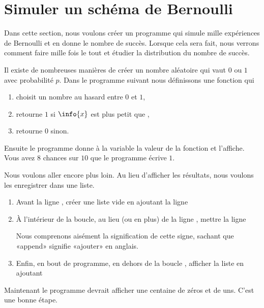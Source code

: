 \section{Simuler un schéma de Bernoulli}
\label{SecSimulBernrfNskC}

Dans cette section, nous voulons créer un programme qui simule mille expériences de Bernoulli et en donne le nombre de succès. Lorsque cela sera fait, nous verrons comment faire mille fois le tout et étudier la distribution du nombre de succès.

Il existe de nombreuses manières de créer un nombre aléatoire qui vaut \( 0\) ou \( 1\) avec probabilité \( p\). Dans le programme suivant nous définissons une fonction qui
\begin{enumerate}
\item
choisit un nombre  au hasard entre \( 0\) et \( 1\),
\item
retourne \( 1\) si \( \info{x}\) est plus petit que ,
\item
    retourne \( 0\) sinon.
\end{enumerate}
Ensuite le programme donne à la variable  la valeur de la fonction et l'affiche. Vous avez \( 8\) chances sur \( 10\) que le programme écrive \( 1\).




Nous voulons aller encore plus loin. Au lieu d'afficher les résultats, nous voulons les enregistrer dans une liste.
\begin{enumerate}
    \item
        Avant la ligne , créer une liste vide en ajoutant la ligne
        \begin{quote}
        \end{quote}
    \item
        À l'intérieur de la boucle, au lieu (ou en plus) de la ligne , mettre la ligne
        \begin{quote}
        \end{quote}
        Nous comprenons aisément la signification de cette signe, sachant que «append» signifie «ajouter» en anglais.
    \item
        Enfin, en bout de programme, en dehors de la boucle , afficher la liste en ajoutant
        \begin{quote}
        \end{quote}
\end{enumerate}
Maintenant le programme devrait afficher une centaine de zéros et de uns. C'est une bonne étape. 

